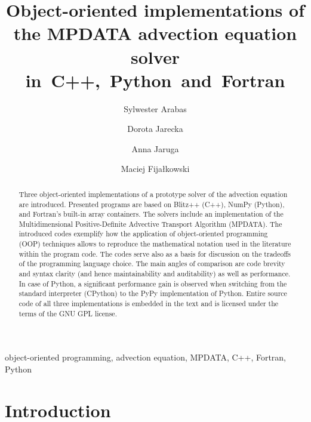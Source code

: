 \documentclass[final,5p,times,twocolumn]{elsarticle}
\begin{document}
  \begin{frontmatter}

    \title{
      Object-oriented implementations of the MPDATA advection equation solver in~C++,~Python~and~Fortran
    }

    \author[1]{Sylwester Arabas}
    \author[1]{Dorota Jarecka}
    \author[1]{Anna Jaruga}
    \author[2]{Maciej Fijałkowski}

    \address[1]{Institute of Geophysics, Faculty of Physics, University of Warsaw}
    \address[2]{PyPy Team}

    \begin{abstract}
        Three object-oriented implementations of a prototype solver of the advection equation are introduced.
        Presented programs are based on Blitz++ (C++), NumPy (Python), and Fortran's built-in array containers.
        The solvers include an implementation of the Multidimensional Positive-Definite 
          Advective Transport Algorithm (MPDATA).
        The introduced codes exemplify how the application of 
          object-oriented programming (OOP) techniques allows to reproduce the mathematical notation 
          used in the literature within the program code.
        The codes serve also as a basis for discussion on the tradeoffs of the programming language choice.
        The main angles of comparison are code brevity and syntax clarity
          (and hence maintainability and auditability) as well as performance.
        In case of Python, a significant performance gain is observed when switching from the standard 
          interpreter (CPython) to the PyPy implementation of Python.
        Entire source code of all three implementations is embedded in the text and is licensed
          under the terms of the GNU GPL license. 
    \end{abstract}

    \begin{keyword}
      object-oriented programming, advection equation, MPDATA, C++, Fortran, Python
    \end{keyword}

  \end{frontmatter}

  \tableofcontents

  \section{Introduction}
\end{document}
